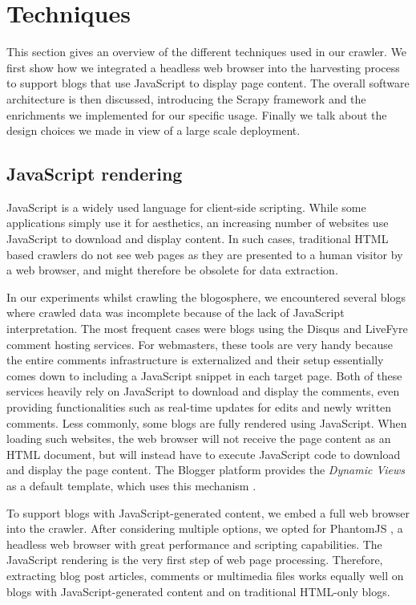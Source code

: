 \section{Techniques}
\label{techniques}

This section gives an overview of the different techniques used in our crawler. We first show how we integrated a headless web browser into the harvesting process to support blogs that use JavaScript to display page content. The overall software architecture is then discussed, introducing the Scrapy framework and the enrichments we implemented for our specific usage. Finally we talk about the design choices we made in view of a large scale deployment.


\subsection{JavaScript rendering}
JavaScript is a widely used language for client-side scripting. While some applications simply use it for aesthetics, an increasing number of websites use JavaScript to download and display content. In such cases, traditional HTML based crawlers do not see web pages as they are presented to a human visitor by a web browser, and might therefore be obsolete for data extraction.

In our experiments whilst crawling the blogosphere, we encountered several blogs where crawled data was incomplete because of the lack of JavaScript interpretation. The most frequent cases were blogs using the Disqus \cite{disqus2013} and LiveFyre \cite{livefyre2013} comment hosting services. For webmasters, these tools are very handy because the entire comments infrastructure is externalized and their setup essentially comes down to including a JavaScript snippet in each target page. Both of these services heavily rely on JavaScript to download and display the comments, even providing functionalities such as real-time updates for edits and newly written comments. Less commonly, some blogs are fully rendered using JavaScript. When loading such websites, the web browser will not receive the page content as an HTML document, but will instead have to execute JavaScript code to download and display the page content. The Blogger platform provides the \emph{Dynamic Views} as a default template, which uses this mechanism \cite{antinharasymiv2011}.

To support blogs with JavaScript-generated content, we embed a full web browser into the crawler. After considering multiple options, we opted for PhantomJS \cite{phantomjs2013}, a headless web browser with great performance and scripting capabilities. The JavaScript rendering is the very first step of web page processing. Therefore, extracting blog post articles, comments or multimedia files works equally well on blogs with JavaScript-generated content and on traditional HTML-only blogs.


